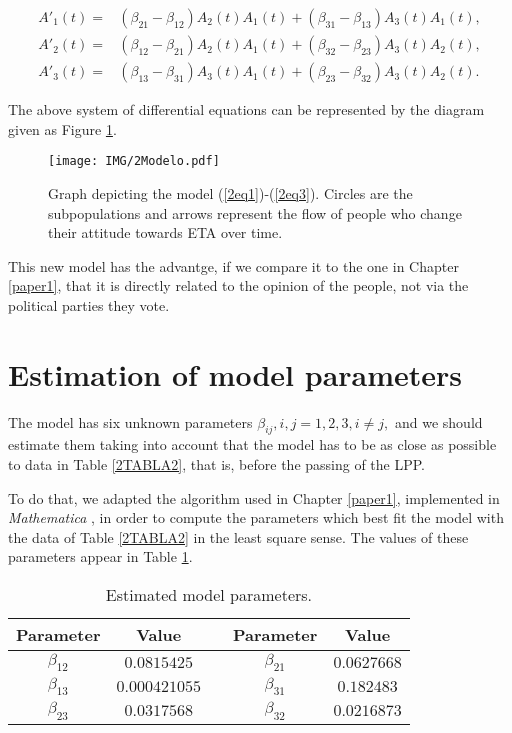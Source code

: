 \begin{eqnarray}
A'_1(t) = &  (\beta_{21}  - \beta_{12}) A_2(t) A_1(t) + (\beta_{31}  - \beta_{13} ) A_3(t) A_1(t), \label{2eq1} \\
A'_2(t) = &  (\beta_{12}  - \beta_{21}) A_2(t) A_1(t) + (\beta_{32}  - \beta_{23} ) A_3(t) A_2(t), \\
A'_3(t) = &  (\beta_{13}  - \beta_{31}) A_3(t) A_1(t) + (\beta_{23}  - \beta_{32} ) A_3(t) A_2(t). \label{2eq3}                           
\end{eqnarray} 

The above system of differential equations can be represented by the diagram given as Figure \ref{2Modelo}.
 
\begin{figure}[h]
 \begin{center}
  \texttt{[image: IMG/2Modelo.pdf]}\\
  \caption{Graph depicting the model (\ref{2eq1})-(\ref{2eq3}). Circles are the subpopulations and arrows represent the flow of people who change their attitude towards ETA over time.}\label{2Modelo}
\end{center}
\end{figure} 

This new model has the advantge, if we compare it to the one in Chapter \ref{paper1}, that it is directly related to the opinion of the people, not via the political parties they vote.  

\section{Estimation of model parameters}\label{2.3}
The model has six unknown parameters $\beta_{ij}, i,j=1,2,3, i \neq j,$ and we should estimate them taking into account that the model has to be as close as possible to data in Table \ref{2TABLA2}, that is, before the passing of the LPP. 

To do that, we adapted the algorithm used in Chapter \ref{paper1}, implemented in \textit{Mathematica} \cite{Wolfram}, in order to compute the parameters which best fit the model with the data of Table \ref{2TABLA2} in the least square sense. The values of these parameters appear in Table \ref{2TABLA4}.

\begin{table}[ht]
\centering
\begin{tabular}{|cc|c|cc|}
\hline
Parameter & Value & & Parameter & Value \\ 
\hline
$\beta_{12}$  & $0.0815425$ & & $\beta_{21}$ & $0.0627668$ \\
$\beta_{13}$  & $0.000421055$ & & $\beta_{31}$ & $0.182483$ \\
$\beta_{23}$  & $0.0317568$ & & $\beta_{32}$ & $0.0216873$ \\
\hline 
\end{tabular}
\caption{Estimated model parameters.}
\label{2TABLA4} 
\end{table}

